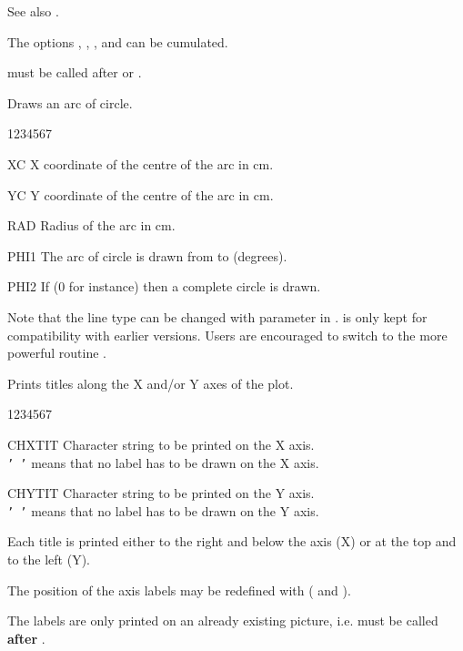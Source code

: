 \Remarks
\begin{UL}
\item See also .
\item The options , , ,  and  can
      be cumulated.
\item {} must be called after  or .
\end{UL}


\Action
Draws an arc of circle.
\Pdesc
\begin{DLtt}{1234567}
\item[XC]   X coordinate of the centre of the arc in cm.
\item[YC]   Y coordinate of the centre of the arc in cm.
\item[RAD]  Radius of the arc in cm.
\item[PHI1] The arc of circle is drawn from  to  (degrees).
\item[PHI2] If  (0 for instance) then a complete circle is
            drawn.
\end{DLtt}
Note that the line type can be changed with parameter
in .
\Remark
{} is only kept for compatibility with earlier versions. Users are
encouraged to switch to the more powerful \HIGZ{} routine .


\Action
Prints titles along the X and/or Y axes of the plot.
\Pdesc
\begin{DLtt}{1234567}
\item[CHXTIT] Character string to be printed on the X axis.\\
              {\tt' '} means that no label has to be drawn on the X axis.
\item[CHYTIT] Character string to be printed on the Y axis.\\
              {\tt' '} means that no label has to be drawn on the Y axis.
\end{DLtt}
\Remarks
\begin{UL}
\item Each title is printed either to the right and below the axis (X) or at
      the top and to the left (Y).
\item The position of the axis labels may be redefined with 
      ( and ).
\item The labels are only printed on an already existing picture, i.e.
       must be called {\bf after} .
\end{UL}


